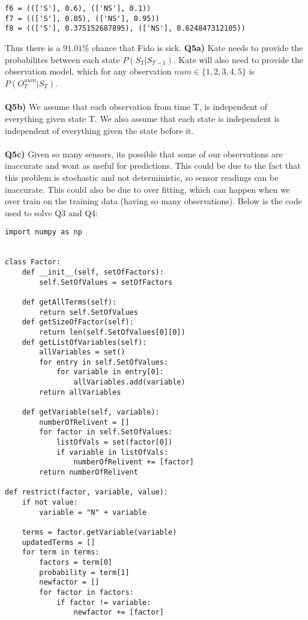 \documentclass{article}
\begin{document}
\begin{titlepage}
\begin{lstlisting}
f6 = ((['S'], 0.6), (['NS'], 0.1))
f7 = ((['S'], 0.05), (['NS'], 0.95))
f8 = ((['S'], 0.375152687895), (['NS'], 0.624847312105))
\end{lstlisting}
Thus there is a $91.01\%$ chance that Fido is sick.
\newpage
\textbf{Q5a)} Kate needs to provide the probabilites between each state $P(S_T | S_{T-1})$. Kate will also need to provide the observation model, which for any observation $num \in \{1,2,3,4,5\}$ is $P(O^{num}_T | S_T)$.\\\\
\textbf{Q5b)} We assume that each observation from time T, is independent of everything given state T. We also assume that each state is independent is independent of everything given the state before it. \\\\
\textbf{Q5c)} Given so many sensors, its possible that some of our observations are inaccurate and wont as useful for predictions. This could be due to the fact that this problem is stochastic and not deterministic, so sensor readings can be inaccurate. This could also be due to over fitting, which can happen when we over train on the training data (having so many observations). 
\newpage
Below is the code used to solve Q3 and Q4:
\begin{lstlisting}
import numpy as np


class Factor:
    def __init__(self, setOfFactors):
        self.SetOfValues = setOfFactors

    def getAllTerms(self):
        return self.SetOfValues
    def getSizeOfFactor(self):
        return len(self.SetOfValues[0][0])
    def getListOfVariables(self):
        allVariables = set()
        for entry in self.SetOfValues:
            for variable in entry[0]:
                allVariables.add(variable)
        return allVariables

    def getVariable(self, variable):
        numberOfRelivent = []
        for factor in self.SetOfValues:
            listOfVals = set(factor[0])
            if variable in listOfVals:
                numberOfRelivent += [factor]
        return numberOfRelivent

def restrict(factor, variable, value):
    if not value:
        variable = "N" + variable

    terms = factor.getVariable(variable)
    updatedTerms = []
    for term in terms:
        factors = term[0]
        probability = term[1]
        newfactor = []
        for factor in factors:
            if factor != variable:
                newfactor += [factor]


\end{lstlisting}
\end{titlepage}
\end{document}
